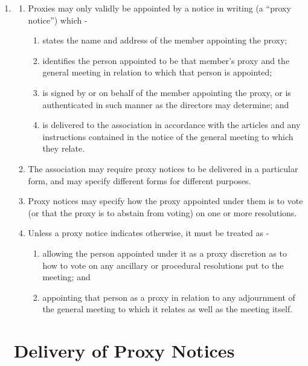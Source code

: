 \begin{enumerate}
\item \label{proxies}
  \begin{enumerate}
  \item
    Proxies may only validly be appointed by a notice in writing (a
    ``proxy notice'') which -
    \begin{enumerate}
    \item
      states the name and address of the member appointing the proxy;
    \item
      identifies the person appointed to be that member's proxy and the
      general meeting in relation to which that person is appointed;
    \item
      is signed by or on behalf of the member appointing the proxy, or is
      authenticated in such manner as the directors may determine; and
    \item
      is delivered to the association in accordance with the articles and any
      instructions contained in the notice of the general meeting to
      which they relate.
    \end{enumerate}
  \item
    The association may require proxy notices to be delivered in a
    particular form, and may specify different forms for different
    purposes.
  \item
    Proxy notices may specify how the proxy appointed under them is to
    vote (or that the proxy is to abstain from voting) on one or more
    resolutions.
  \item
    Unless a proxy notice indicates otherwise, it must be treated as -
    \begin{enumerate}
    \item
      allowing the person appointed under it as a proxy discretion as to
      how to vote on any ancillary or procedural resolutions put to the
      meeting; and
    \item
      appointing that person as a proxy in relation to any adjournment of
      the general meeting to which it relates as well as the meeting
      itself.
    \end{enumerate}
  \end{enumerate}

\section{Delivery of Proxy Notices}


\end{enumerate}
